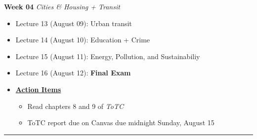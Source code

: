 \documentclass[11pt]{article}
\begin{document}
		\textbf{Week 04} \textit{Cities \& Housing + Transit}
	\begin{itemize}
		\item Lecture 13 (August 09): Urban transit
		\item Lecture 14 (August 10): Education + Crime
		\item Lecture 15 (August 11): Energy, Pollution, and Sustainabiliy
		\item Lecture 16 (August 12): \textbf{Final Exam}
		\item[]\underline{\textbf{Action Items}}
		\begin{itemize}
				\item Read chapters 8 and 9 of \textit{ToTC}
				\item ToTC report due on Canvas due midnight Sunday, August 15
		\end{itemize}
	\end{itemize}
	\noindent\rule[0.5ex]{\linewidth}{1pt}
	
\end{document}
